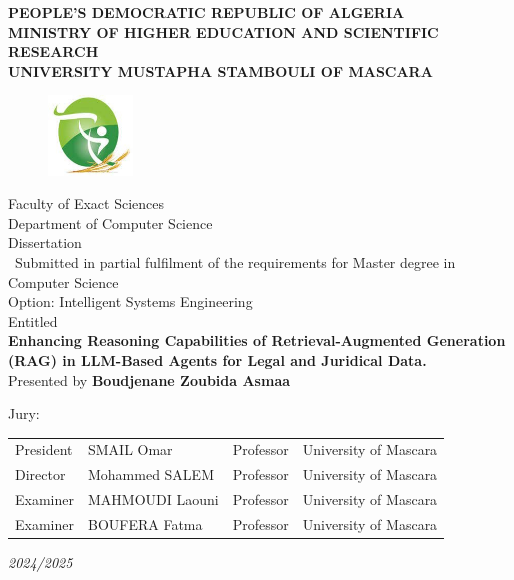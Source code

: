 \thispagestyle{empty}
\begin{center}
	\begin{title}
		\textbf{\uppercase{ People's Democratic Republic of Algeria }} \\[0.2cm]
		\textbf{\uppercase{ MINISTRY OF HIGHER EDUCATION AND SCIENTIFIC RESEARCH }} \\[0.5cm]
		\textbf{\uppercase{ UNIVERSITY MUSTAPHA STAMBOULI OF MASCARA}}
	\end{title}
	\begin{figure}[H]
		\centering
		\label{logo_UD}\includegraphics[width=0.2\textwidth]{Figures/Logo_UM.jpg}
	\end{figure}
	{\large Faculty of Exact Sciences} \\[0.2cm]
	{\large Department of Computer Science} \\[0.2cm]
	{\large Dissertation } \\[0.2cm]
	{\ Submitted in partial fulfilment of the requirements for Master degree in Computer Science} \\[0.2cm]
	{\large Option: Intelligent Systems Engineering }\\[0.5cm]
	
    {\large Entitled} \\[0.3cm]
	{\LARGE {\textbf{Enhancing Reasoning Capabilities of Retrieval-Augmented Generation (RAG) in LLM-Based Agents for Legal and Juridical Data.}}}
	\\[0.7cm]

	{\large Presented by \textbf{Boudjenane Zoubida Asmaa} }\\[0.5cm]

\end{center}
Jury:\\
\begin{tabular}{llll}
	President    &  SMAIL Omar & Professor & University of Mascara\\
	Director     &  Mohammed SALEM & Professor & University of Mascara\\
	Examiner     & 	MAHMOUDI Laouni & Professor	& University of Mascara\\
	Examiner	 &  BOUFERA Fatma & Professor  & University of Mascara\\

\end{tabular}
\vfill
\begin{center}
	
	\it{2024/2025}
\end{center}